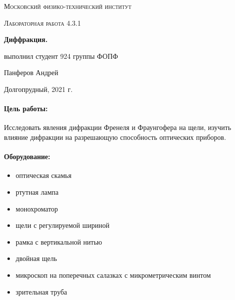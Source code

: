 \documentclass[a4paper]{article}
\begin{document}
	
\begin{titlepage}
	\centering
	\vspace{5cm}
	{\scshape\LARGE Московский физико-технический институт \par}
	\vspace{4cm}
	{\scshape\Large Лабораторная работа 4.3.1 \par}
	\vspace{1cm}
	{\huge\bfseries Диффракция. \par}
	\vspace{1cm}
	\vfill
\begin{flushright}
	{\large выполнил студент 924 группы ФОПФ}\par
	\vspace{0.3cm}
	{\LARGE Панферов Андрей}
\end{flushright}
	

	\vfill

	Долгопрудный, 2021 г.
\end{titlepage}

\paragraph*{Цель работы:} Исследовать явления дифракции Френеля и Фраунгофера на щели, изучить влияние дифракции на разрешающую способность оптических приборов.
	
\paragraph*{Оборудование:} 
\begin{itemize}
    \item оптическая скамья
    \item ртутная лампа
    \item монохроматор
    \item щели с регулируемой шириной
    \item рамка с вертикальной нитью
    \item двойная щель
    \item микроскоп на поперечных салазках с микрометрическим винтом
    \item зрительная труба
\end{itemize}
\end{document}
